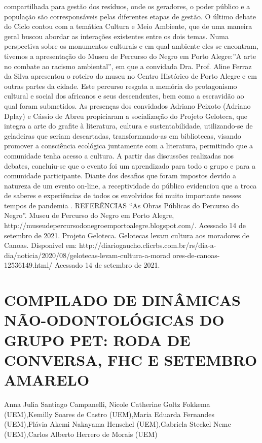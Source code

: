 compartilhada para gestão dos resíduos, onde os geradores, o poder público e a população são
corresponsáveis pelas diferentes etapas de gestão.
O último debate do Ciclo contou com a temática Cultura e Meio Ambiente, que de uma
maneira geral buscou abordar as interações existentes entre os dois temas. Numa perspectiva
sobre os monumentos culturais e em qual ambiente eles se encontram, tivemos a apresentação do
Museu de Percurso do Negro em Porto Alegre:”A arte no combate ao racismo ambiental”, em
que a convidada Dra. Prof. Aline Ferraz da Silva apresentou o roteiro do museu no Centro
Histórico de Porto Alegre e em outras partes da cidade. Este percurso resgata a memória do
protagonismo cultural e social dos africanos e seus descendentes, bem como a escravidão ao qual
foram submetidos. As presenças dos convidados Adriano Peixoto (Adriano Dplay) e Cássio de
Abreu propiciaram a socialização do Projeto Geloteca, que integra a arte do grafite à literatura,
cultura e sustentabilidade, utilizando-se de geladeiras que seriam descartadas, transformando-as
em bibliotecas, visando promover a consciência ecológica juntamente com a literatura,
permitindo que a comunidade tenha acesso a cultura.
A partir das discussões realizadas nos debates, concluiu-se que o evento foi um
aprendizado para todo o grupo e para a comunidade participante. Diante dos desafios que foram
impostos devido a natureza de um evento on-line, a receptividade do público evidenciou que a
troca de saberes e experiências de todos os envolvidos foi muito importante nesses tempos de
pandemia .
REFERÊNCIAS
“As Obras Públicas do Percurso do Negro”. Museu de Percurso do Negro em Porto Alegre,
http://museudepercursodonegroemportoalegre.blogspot.com/. Acessado 14 de setembro de 2021.
Projeto Geloteca. Gelotecas levam cultura aos moradores de Canoas. Dísponivel em:
http://diariogaucho.clicrbs.com.br/rs/dia-a-dia/noticia/2020/08/gelotecas-levam-cultura-a-morad
ores-de-canoas-12536149.html/ Acessado 14 de setembro de 2021.



\section{COMPILADO DE DINÂMICAS NÃO-ODONTOLÓGICAS DO GRUPO PET: RODA DE CONVERSA, FHC E SETEMBRO AMARELO}

Anna Julia Santiago Campanelli, Nicole Catherine Goltz Fokkema (UEM),Kemilly Soares de Castro (UEM),Maria Eduarda Fernandes (UEM),Flávia Akemi Nakayama Henschel (UEM),Gabriela Steckel Neme (UEM),Carlos Alberto Herrero de Morais (UEM)

